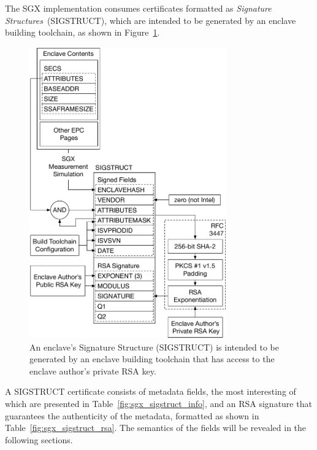 The SGX implementation consumes certificates formatted as
\textit{Signature Structures}~(SIGSTRUCT), which are intended to be generated
by an enclave building toolchain, as shown in Figure~\ref{fig:sgx_sigstruct}.

\begin{figure}[hbt]
  \centering
  \includegraphics[width=85mm]{figures/sgx_sigstruct.pdf}
  \caption{
    An enclave's Signature Structure (SIGSTRUCT) is intended to be generated by
    an enclave building toolchain that has access to the enclave author's
    private RSA key.
  }
  \label{fig:sgx_sigstruct}
\end{figure}

A SIGSTRUCT certificate consists of metadata fields, the most interesting of
which are presented in Table~\ref{fig:sgx_sigstruct_info}, and an RSA
signature that guarantees the authenticity of the metadata, formatted as shown
in Table~\ref{fig:sgx_sigstruct_rsa}. The semantics of the fields will be
revealed in the following sections.

